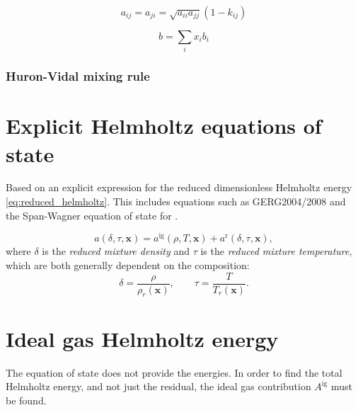 \documentclass[english]{../thermomemo/thermomemo}
\newcommand*{\vektor}[1]{\boldsymbol{#1}}%
\begin{document}
\begin{equation}
  a_{ij} = a_{ji} = \sqrt{a_{ii} a_{jj}} \left( 1-k_{ij} \right)
  \label{}
\end{equation}

\begin{equation}
  b = \sum_i x_i b_i
  \label{}
\end{equation}


\subsubsection{Huron-Vidal mixing rule}



\section{Explicit Helmholtz equations of state}
Based on an explicit expression for the reduced dimensionless Helmholtz energy \eqref{eq:reduced_helmholtz}. This includes 
equations such as GERG2004/2008 and the Span-Wagner equation of state for .

\begin{equation}
  a(\delta,\tau,\vektor{x}) = a^\text{ig}(\rho,T,\vektor{x}) + a^\text{r}(\delta,\tau,\vektor{x}),
  \label{}
\end{equation}
where $\delta$ is the \textit{reduced mixture density} and $\tau$ is the \textit{reduced mixture temperature}, which are both generally 
dependent on the composition:
\begin{equation}
  \delta = \frac{\rho}{\rho_r(\vektor{x})}, \quad \quad \tau = \frac{T}{T_r(\vektor{x})}.
  \label{}
\end{equation}


\section{Ideal gas Helmholtz energy}
The equation of state does not provide the energies.
In order to find the total Helmholtz energy, and not just the residual, 
the ideal gas contribution $A^\text{ig}$ must be found.
\end{document}
